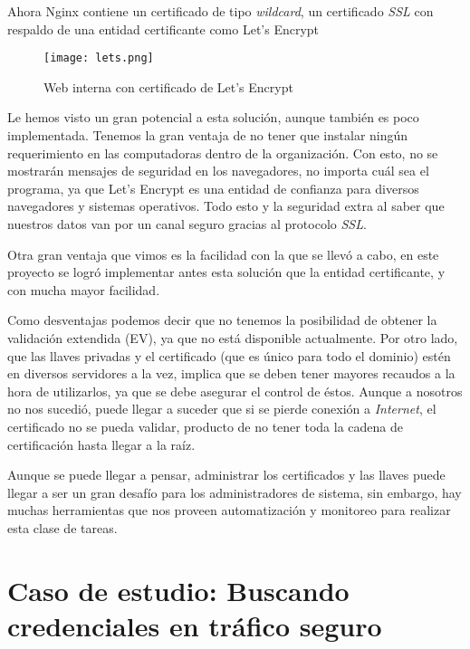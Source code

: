 Ahora Nginx contiene un certificado de tipo \emph{wildcard}, un certificado \emph{SSL} con respaldo de una 
entidad certificante como Let's Encrypt

\begin{center}
   \begin{figure}   
      \begin{center}
         \texttt{[image: lets.png]}
      \end{center}
      \caption{Web interna con certificado de Let’s Encrypt}
   \end{figure}
\end{center}

Le hemos visto un gran potencial a esta solución, aunque también es poco implementada. Tenemos la gran ventaja de no
tener que instalar ningún requerimiento en las computadoras dentro de la organización. Con esto, no se 
mostrarán mensajes de seguridad en los navegadores, no importa cuál sea el programa, ya que Let's Encrypt es 
una entidad de confianza para diversos navegadores y sistemas operativos. Todo esto y la seguridad extra al 
saber que nuestros datos van por un canal seguro gracias al protocolo \emph{SSL}. 

Otra gran ventaja que vimos es la facilidad con la que se llevó a cabo, 
en este proyecto se logró implementar antes esta solución que la entidad certificante, y 
con mucha mayor facilidad. 

Como desventajas podemos decir que no tenemos la posibilidad de obtener la validación extendida (EV), ya que no está
disponible actualmente. Por otro lado, que las llaves privadas y el certificado (que es único para todo el dominio) 
estén en diversos servidores a la vez, implica
que se deben tener mayores recaudos a la hora de utilizarlos, ya que se debe asegurar el control de éstos. Aunque a 
nosotros no nos sucedió, puede llegar a suceder que si se pierde conexión a \emph{Internet}, el certificado no se pueda validar,
producto de no tener toda la cadena de certificación hasta llegar a la raíz. 

Aunque se puede llegar a pensar, administrar los certificados y las llaves puede llegar a ser 
un gran desafío para los administradores de sistema, sin embargo, hay muchas herramientas que nos proveen
automatización y monitoreo para realizar esta clase de tareas. 


\section{Caso de estudio: Buscando credenciales en tráfico seguro}

